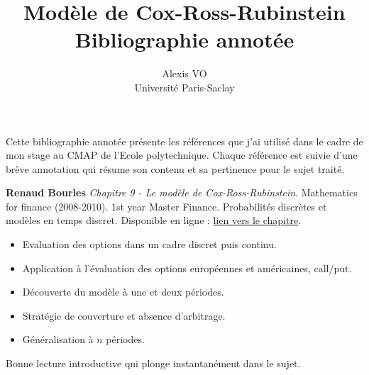 \documentclass[11pt]{article}
\title{Modèle de Cox-Ross-Rubinstein\\\medskip Bibliographie annotée}
\author{Alexis VO\\Université Paris-Saclay}
\begin{document}
\maketitle

Cette bibliographie annotée présente les références que j'ai utilisé dans le cadre de mon stage au CMAP de l'Ecole polytechnique. Chaque référence est suivie d'une brève annotation qui résume son contenu et sa pertinence pour le sujet traité.

\vspace{1em}

\textbf{Renaud Bourles} \textit{Chapitre 9 - Le modèle de Cox-Ross-Rubinstein}. Mathematics for finance (2008-2010). 1st year Master Finance. Probabilités discrètes et modèles en temps discret.
Disponible en ligne : \href{http://renaud.bourles.perso.centrale-med.fr/MathsFi/Chap%209%20-%20Le%20modele%20Cox-Ross-Rubinstein.pdf}{lien vers le chapitre}.
\begin{itemize}
    \item Evaluation des options dans un cadre discret puis continu.
    \item Application à l'évaluation des options européennes et américaines, call/put.
    \item Découverte du modèle à une et deux périodes.
    \item Stratégie de couverture et absence d'arbitrage.
    \item Généralisation à $n$ périodes.
\end{itemize}
Bonne lecture introductive qui plonge instantanément dans le sujet.\\ 

\vspace{1em}
\end{document}
